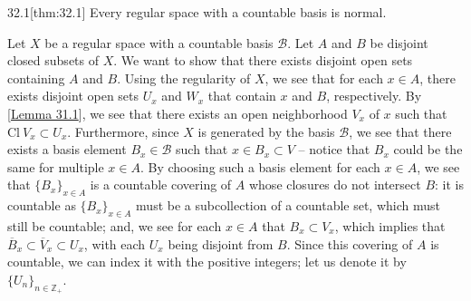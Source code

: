 \begin{thmBox}{32.1}[thm:32.1]
    Every regular space with a countable basis is normal.

    \baseRule

    \begin{proofBox}
        Let \( X \) be a regular space with a countable basis \( \mathcal{B} \). 
        Let \( A \) and \( B \) be disjoint closed subsets of \( X \).
        We want to show that there exists disjoint open sets containing \( A \) and 
        \( B \).
        Using the regularity of \( X \), we see that for each \( x \in A \), there 
        exists disjoint open sets \( U_{ x } \) and \( W_{ x } \) that contain \( x \) 
        and \( B \),
        respectively.
        By [\hyperlink{lem:31.1}{Lemma 31.1}], we see that there exists an open 
        neighborhood \( V_{ x } \) of \( x \) such that 
        \( \mathrm{Cl} \ V_{ x } \subset U_{ x } \).
        Furthermore, since \( X \) is generated by the basis \( \mathcal{B} \), we see 
        that there exists a basis element \( B_{ x } \in \mathcal{B} \) such that 
        \( x \in B_{ x } \subset V \) -- notice that \( B_{ x } \) could be the 
        same for multiple \( x \in A \).
        By choosing such a basis element for each \( x \in A \), we see that 
        \( \{ B_{ x } \}_{ x \in A } \) is a countable covering of \( A \) whose closures do not intersect \( B \): it is countable as 
        \( \{ B_{ x } \}_{ x \in A } \) must be a subcollection of a countable set, 
        which must still be countable; and, we see for each \( x \in A \) that 
        \( B_{ x } \subset V_{ x } \), which implies that 
        \( \overline{ B }_{ x } \subset \overline{ V }_{ x } \subset U_{ x } \),
        with each \( U_{ x } \) being disjoint from \( B \).
        Since this covering of \( A \) is countable, we can index it with the 
        positive integers; let us denote it by 
        \( \{ U_{ n } \}_{ n \in \mathbb{Z}_{ + } } \).

        \baseSkip


\end{proofBox}
\end{thmBox}
